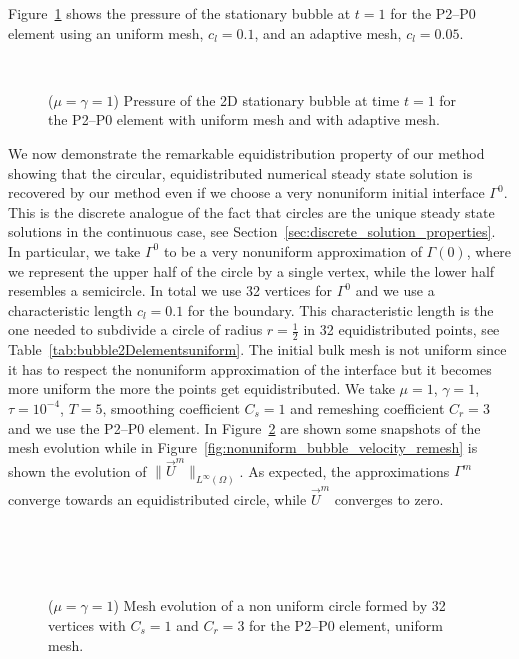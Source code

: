 \documentclass[a4paper,12pt,onecolumn]{article}
\begin{document}
Figure~\ref{fig:2d_stationary_bubble} shows the pressure of the stationary bubble at $t=1$ for the P2--P0 element using an uniform mesh, $c_l=0.1$, and an adaptive mesh, $c_l=0.05$.
\begin{figure}[htbp]
  \centering
  \quad
  \\
  \caption{($\mu=\gamma=1$) Pressure of the 2D stationary bubble at time $t=1$ for the P2--P0 element with uniform mesh and with adaptive mesh.}
  \label{fig:2d_stationary_bubble}
\end{figure}

We now demonstrate the remarkable equidistribution property of our method showing that the circular, equidistributed numerical steady state solution is recovered by our method even if we choose a very nonuniform initial interface $\Gamma^0$. This is the discrete analogue of the fact that circles are the unique steady state solutions in the continuous case, see Section~\ref{sec:discrete_solution_properties}. In particular, we take $\Gamma^0$ to be a very nonuniform approximation of $\Gamma(0)$, where we represent the upper half of the circle by a single vertex, while the lower half resembles a semicircle. In total we use 32 vertices for $\Gamma^0$ and we use a characteristic length $c_l=0.1$ for the boundary. This characteristic length is the one needed to subdivide a circle of radius $r=\frac{1}{2}$ in 32 equidistributed points, see Table~\ref{tab:bubble2Delementsuniform}. The initial bulk mesh is not uniform since it has to respect the nonuniform approximation of the interface but it becomes more uniform the more the points get equidistributed. We take $\mu=1$, $\gamma=1$, $\tau=10^{-4}$, $T=5$, smoothing coefficient $C_s=1$ and remeshing coefficient $C_r=3$ and we use the P2--P0 element. In Figure~\ref{fig:nonuniform_bubble_remesh} are shown some snapshots of the mesh evolution while in Figure~\ref{fig:nonuniform_bubble_velocity_remesh} is shown the evolution of $\|\vec U^m\|_{L^\infty(\Omega)}$. As expected, the approximations $\Gamma^m$ converge towards an equidistributed circle, while $\vec U^m$ converges to zero.
\begin{figure}[htbp]
  \centering
  \\
  \quad
  \\
  \quad
  \\
  \caption{($\mu=\gamma=1$) Mesh evolution of a non uniform circle formed by 32 vertices with $C_s=1$ and $C_r=3$ for the P2--P0 element, uniform mesh.}
  \label{fig:nonuniform_bubble_remesh}
\end{figure}
\end{document}
